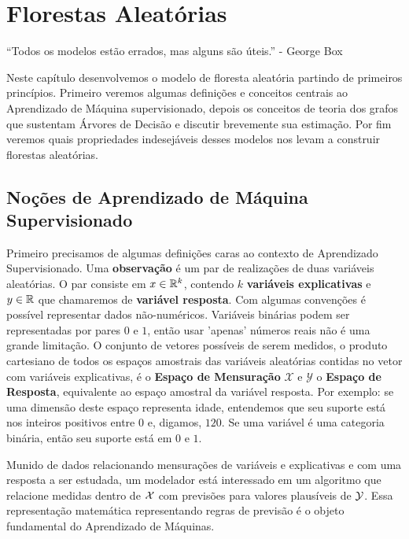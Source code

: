 
\chapter{Florestas Aleatórias}

\begin{citacao}
	``Todos os modelos estão errados, mas alguns são úteis.''  - George Box
\end{citacao}

Neste capítulo desenvolvemos o modelo de floresta aleatória partindo de primeiros princípios. Primeiro veremos algumas definições e conceitos centrais ao Aprendizado de Máquina supervisionado, depois os conceitos de teoria dos grafos que sustentam Árvores de Decisão e discutir brevemente sua estimação. Por fim veremos quais propriedades indesejáveis desses modelos nos levam a construir florestas aleatórias. 

\section{Noções de Aprendizado de Máquina Supervisionado}

Primeiro precisamos de algumas definições caras ao contexto de Aprendizado Supervisionado. Uma \textbf{observação} é um par de realizações de duas variáveis aleatórias. O par consiste em $x \in \mathbb{R}^k$, contendo $k$ \textbf{variáveis explicativas} e $y \in \mathbb{R}$ que chamaremos de \textbf{variável resposta}. Com algumas convenções é possível representar dados não-numéricos. Variáveis binárias podem ser representadas por pares $0$ e $1$, então usar 'apenas' números reais não é uma grande limitação. O conjunto de vetores possíveis de serem medidos, o produto cartesiano de todos os espaços amostrais das variáveis aleatórias contidas no vetor com variáveis explicativas, é o \textbf{Espaço de Mensuração} $\mathcal{X}$ e $\mathcal{Y}$ o \textbf{Espaço de Resposta}, equivalente ao espaço amostral da variável resposta. Por exemplo: se uma dimensão deste espaço representa idade, entendemos que seu suporte está nos inteiros positivos entre $0$ e, digamos, $120$. Se uma variável é uma categoria binária, então seu suporte está em $0$ e $1$. 

Munido de dados relacionando mensurações de variáveis e explicativas e com uma resposta a ser estudada, um modelador está interessado em um algoritmo que relacione medidas dentro de $\mathcal{X}$ com previsões para valores plausíveis de $\mathcal{Y}$. Essa representação matemática representando regras de previsão é o objeto fundamental do Aprendizado de Máquinas.

